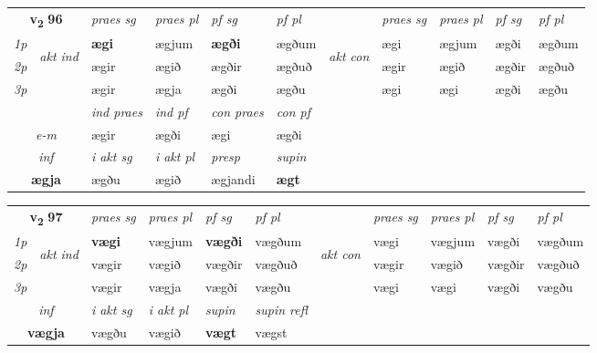 \noindent
\begin{tabular}{lllllllllll} \toprule
\multicolumn{2}{c}{\textbf{v{\textsubscript{2}}} \Large{\textbf{96}}}  &  \textit{praes sg}  & \textit{praes pl}  &\textit{ pf sg} & \textit{pf pl} &  &  \textit{praes sg}  & \textit{praes pl}  & \textit{pf sg} & \textit{pf pl } \\*
	\cmidrule{3-6} \cmidrule{8-11}
 {\textit{1p}} & \multirow{3}{*}{\begin{turn}{90}\textit{akt ind}\end{turn}} & \textbf{ægi} & ægjum & \textbf{ægði} & ægðum & \multirow{3}{*}{\begin{turn}{90}\textit{akt con}\end{turn}} &ægi & ægjum & ægði & ægðum\\*
 {\textit{2p}} &  &  ægir  & ægið & ægðir & ægðuð & & ægir & ægið & ægðir & ægðuð \\*
{\textit{3p}} &  & ægir & ægja & ægði & ægðu & & ægi & ægi& ægði & ægðu \\*
\cmidrule{3-6} \cmidrule{8-11}

   & &  \textit{ind praes} & \textit{ind pf} & \textit{con praes} & \textit{con pf} \\*
\multicolumn{2}{c}{ \textit{e-m} } & ægir & ægði & ægi & ægði \\*

\cmidrule{3-6}
   \multicolumn{2}{c}{\textit{inf}}  & \textit{i akt sg} & \textit{i akt pl}   & \textit{presp} & \textit{supin}   \\*
  \multicolumn{2}{c}{\textbf{ægja}} & ægðu  & ægið   & ægjandi &  \textbf{ægt}   \\*
\end{tabular}

\noindent
\begin{tabular}{lllllllllll} \toprule
\multicolumn{2}{c}{\textbf{v{\textsubscript{2}}} \Large{\textbf{97}}}  &  \textit{praes sg}  & \textit{praes pl}  &\textit{ pf sg} & \textit{pf pl} &  &  \textit{praes sg}  & \textit{praes pl}  & \textit{pf sg} & \textit{pf pl } \\*
	\cmidrule{3-6} \cmidrule{8-11}
 {\textit{1p}} & \multirow{3}{*}{\begin{turn}{90}\textit{akt ind}\end{turn}} & \textbf{vægi} & vægjum & \textbf{vægði} & vægðum & \multirow{3}{*}{\begin{turn}{90}\textit{akt con}\end{turn}} &vægi & vægjum & vægði & vægðum\\*
 {\textit{2p}} &  &  vægir  & vægið & vægðir & vægðuð & & vægir & vægið & vægðir & vægðuð \\*
{\textit{3p}} &  & vægir & vægja & vægði & vægðu & & vægi & vægi& vægði & vægðu \\*
\cmidrule{3-6} \cmidrule{8-11}

   \multicolumn{2}{c}{\textit{inf}}  & \textit{i akt sg} & \textit{i akt pl}    & \textit{supin} & \textit{supin refl}  \\*
  \multicolumn{2}{c}{\textbf{vægja}} & vægðu  & vægið    &  \textbf{vægt} & vægst  \\*
\end{tabular}

